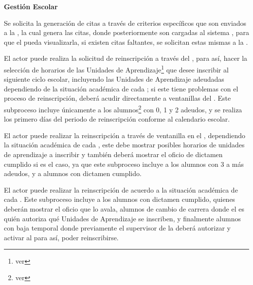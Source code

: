\begin{PDescripcion}
	
	\Ppaso \textbf{Gestión Escolar}
	
	\begin{enumerate}
		\Ppaso[\PSubProceso]  Se solicita la generación de citas a través de criterios específicos que son enviados a la , la cual genera las citas, donde posteriormente son cargadas al sistema , para que el  pueda visualizarla, si existen citas faltantes, se solicitan estas mismas a la .
		
		\Ppaso[\PSubProceso]  El actor puede realiza la solicitud de reinscripción a través del , para así, hacer la selección de horarios de las Unidades de Aprendizaje\footnote{ver } que desee inscribir al siguiente ciclo escolar, incluyendo las Unidades de Aprendizaje adeudadas dependiendo de la situación académica de cada ; si este tiene problemas con el proceso de reinscripción, deberá acudir directamente a ventanillas del . Este subproceso incluye únicamente a los alumnos\footnote{ver } con 0, 1 y 2 adeudos, y se realiza los primero días del periodo de reinscripción conforme al calendario escolar. 
	
		\Ppaso[\PSubProceso]  El actor puede realizar la reinscripción a través de ventanilla en el , dependiendo la situación académica de cada , este debe mostrar posibles horarios de unidades de aprendizaje a inscribir y también deberá mostrar el oficio de dictamen cumplido si es el caso, ya que este subproceso incluye a los alumnos con 3 a más adeudos, y a alumnos con dictamen cumplido.
		
		\Ppaso[\PSubProceso]  El actor puede realizar la reinscripción de acuerdo a la situación académica de cada . Este subproceso incluye a los alumnos con dictamen cumplido, quienes deberán mostrar el oficio que lo avala, alumnos de cambio de carrera donde el  es quién autoriza qué Unidades de Aprendizaje se inscriben, y finalmente alumnos con baja temporal donde previamente el supervisor de la  deberá autorizar y activar al  para así, poder reinscribirse. 
		

\end{enumerate}
\end{PDescripcion}
